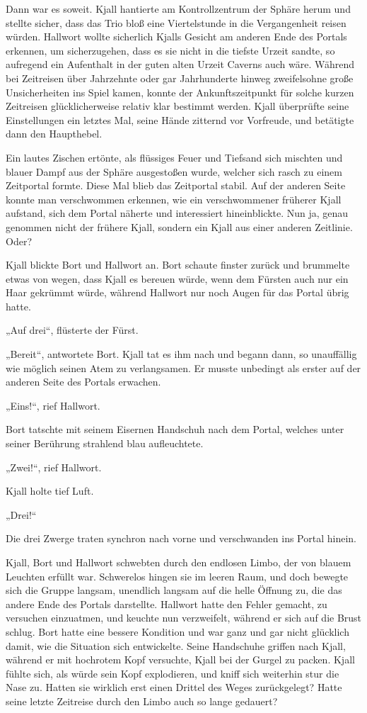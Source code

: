 \documentclass[10pt, a4paper, oneside]{book}
\begin{document}
Dann war es soweit. Kjall hantierte am Kontrollzentrum der Sphäre herum und stellte sicher, dass das Trio bloß eine Viertelstunde in die Vergangenheit reisen würden. Hallwort wollte sicherlich Kjalls Gesicht am anderen Ende des Portals erkennen, um sicherzugehen, dass es sie nicht in die tiefste Urzeit sandte, so aufregend ein Aufenthalt in der guten alten Urzeit Caverns auch wäre. Während bei Zeitreisen über Jahrzehnte oder gar Jahrhunderte hinweg zweifelsohne große Unsicherheiten ins Spiel kamen, konnte der Ankunftszeitpunkt für solche kurzen Zeitreisen glücklicherweise relativ klar bestimmt werden. Kjall überprüfte seine Einstellungen ein letztes Mal, seine Hände zitternd vor Vorfreude, und betätigte dann den Haupthebel.

Ein lautes Zischen ertönte, als flüssiges Feuer und Tiefsand sich mischten und blauer Dampf aus der Sphäre ausgestoßen wurde, welcher sich rasch zu einem Zeitportal formte. Diese Mal blieb das Zeitportal stabil. Auf der anderen Seite konnte man verschwommen erkennen, wie ein verschwommener früherer Kjall aufstand, sich dem Portal näherte und interessiert hineinblickte. Nun ja, genau genommen nicht der frühere Kjall, sondern ein Kjall aus einer anderen Zeitlinie. Oder?

Kjall blickte Bort und Hallwort an. Bort schaute finster zurück und brummelte etwas von wegen, dass Kjall es bereuen würde, wenn dem Fürsten auch nur ein Haar gekrümmt würde, während Hallwort nur noch Augen für das Portal übrig hatte.

„Auf drei“, flüsterte der Fürst.

„Bereit“, antwortete Bort. Kjall tat es ihm nach und begann dann, so unauffällig wie möglich seinen Atem zu verlangsamen. Er musste unbedingt als erster auf der anderen Seite des Portals erwachen.

„Eins!“, rief Hallwort.

Bort tatschte mit seinem Eisernen Handschuh nach dem Portal, welches unter seiner Berührung strahlend blau aufleuchtete.

„Zwei!“, rief Hallwort.

Kjall holte tief Luft.

„Drei!“

Die drei Zwerge traten synchron nach vorne und verschwanden ins Portal hinein.\bigskip



Kjall, Bort und Hallwort schwebten durch den endlosen Limbo, der von blauem Leuchten erfüllt war. Schwerelos hingen sie im leeren Raum, und doch bewegte sich die Gruppe langsam, unendlich langsam auf die helle Öffnung zu, die das andere Ende des Portals darstellte. Hallwort hatte den Fehler gemacht, zu versuchen einzuatmen, und keuchte nun verzweifelt, während er sich auf die Brust schlug. Bort hatte eine bessere Kondition und war ganz und gar nicht glücklich damit, wie die Situation sich entwickelte. Seine Handschuhe griffen nach Kjall, während er mit hochrotem Kopf versuchte, Kjall bei der Gurgel zu packen. Kjall fühlte sich, als würde sein Kopf explodieren, und kniff sich weiterhin stur die Nase zu. Hatten sie wirklich erst einen Drittel des Weges zurückgelegt? Hatte seine letzte Zeitreise durch den Limbo auch so lange gedauert?
\end{document}
